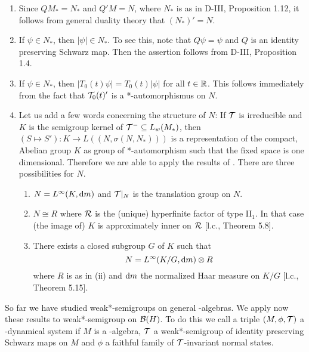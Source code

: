 \begin{remarks}\label{rem:d4-3.6}
\begin{enumerate}[\upshape (i), wide, labelindent=.5em]
\item
Since $QM_{*} = N_{*}$ and $Q'M = N$, where $N_{*}$ is as in D-III, Proposition 1.12, it follows from general duality theory that $(N_{*})' = N$.

\item
If $\psi \in N_{*}$, then $|\psi| \in N_{*}$.
To see this, note that $Q\psi = \psi$ and $Q$ is an identity preserving Schwarz map.
Then the assertion follows from D-III, Proposition 1.4.

\item
If $\psi \in N_{*}$, then $|T_{0}(t)\psi| = T_{0}(t)|\psi|$ for all $t \in \mathbb{R}$.
This follows immediately from the fact that $\mathcal{T}_{0}(t)'$ is a *-automorphismus on $N$.

\item
Let us add a few words concerning the structure of $N$: If $\mathcal{T}$ is irreducible and $K$ is the semigroup kernel of $\mathcal{T}^{-} \subseteq L_{w}(M_{*})$, then $(S \mapsto S'): K \to L((N,\sigma(N,N_{*})))$ is a representation of the compact, Abelian group $K$ as group of *-automorphism such that the fixed space is one dimensional.
Therefore we are able to apply the results of \citet{olesen:1980}.
There are three possibilities for $N$.

\begin{enumerate}[(1)]
\item
$N = L^{\infty}(K,\mathop{}\!\mathrm{d}{m})$ and $\mathcal{T}|_{N}$ is the translation group on $N$.

\item
$N \cong R$ where $\mathcal{R}$ is the (unique) hyperfinite factor of type II$_{1}$.
In that case (the image of) $K$ is approximately inner on $\mathcal{R}$ [l.c., Theorem 5.8].


\item
There exists a closed subgroup $ G $  of $ K $  such that
\[
N = L^{\infty}(K/G, \mathop{}\!\mathrm{d}{m}) \otimes R
\]
where $ R $  is as in (ii) and $ \mathop{}\!\mathrm{d}{m} $  the normalized Haar measure on $ K/G $  [l.c., Theorem 5.15].
\end{enumerate}
\end{enumerate}
\end{remarks}
So far we have studied weak*-semigroups on general \WA-algebras.
We apply now these results to weak*-semigroup on $ \mathcal{B}(H) $.
To do this we call a triple $ (M,\phi,\mathcal{T}) $  a \WA-dynamical system if $ M $  is a \WA-algebra, $ \mathcal{T}$ a weak*-semigroup of identity preserving Schwarz maps on $ M $  and $ \phi $  a faithful family of $ \mathcal{T} $-invariant normal states.
